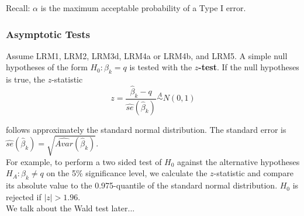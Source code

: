 \documentclass[a4paper,12pt]{article}
\begin{document}
Recall: $\alpha$ is the maximum acceptable probability of a Type I error.

\begin{table}[H]
\end{table}





\subsubsection*{Asymptotic Tests}


Assume LRM1,  LRM2,  LRM3d,  LRM4a or LRM4b,  and LRM5.  A simple null hypotheses of the form $H_0: \beta_k = q$ is tested with the \textbf{$z$-test}. If the null hypotheses is true, the $z$-statistic
$$z =\frac{\hat{\beta}_k-q}{\widehat{se}(\hat{\beta}_k)}\overset{A}{\sim} N(0,1)$$

follows approximately the standard normal distribution. The standard error is $\widehat{se}(\hat{\beta}_k)=\sqrt{\widehat{Avar}(\hat{\beta}_k)}$.\\[2ex]

 For example, to perform a two sided test of $H_0$ against the alternative hypotheses $H_A: \beta_k \neq q$ on the 5\% significance level, we calculate the $z$-statistic and compare its absolute value to the 0.975-quantile of the standard normal distribution. $H_0$ is rejected if $|z|>1.96$.\\[2ex]

We talk about the Wald test later...
\end{document}
